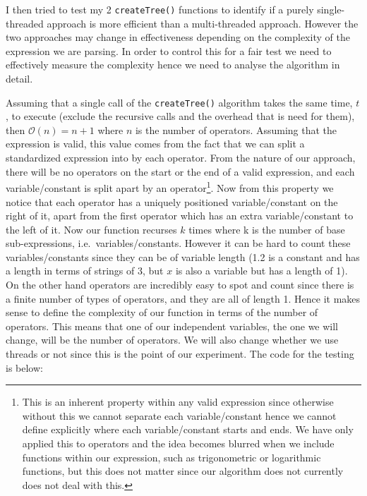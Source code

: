 \documentclass[../../../../../main.tex]{subfiles}
\begin{document}
\newpage\noindent
I then tried to test my 2 \texttt{createTree()} functions to identify if a purely single-threaded approach is more efficient than a multi-threaded approach. However the two approaches may change in effectiveness depending on the complexity of the expression we are parsing. In order to control this for a fair test we need to effectively measure the complexity hence we need to analyse the algorithm in detail.

Assuming that a single call of the \texttt{createTree()} algorithm takes the same time, $t$, to execute (exclude the recursive calls and the overhead that is need for them), then $\mathcal{O}(n) = n+1$ where $n$ is the number of operators. Assuming that the expression is valid, this value comes from the fact that we can split a standardized expression into by each operator. From the nature of our approach, there will be no operators on the start or the end of a valid expression, and each variable/constant is split apart by an operator\footnote{This is an inherent property within any valid expression since otherwise without this we cannot separate each variable/constant hence we cannot define explicitly where each variable/constant starts and ends. We have only applied this to operators and the idea becomes blurred when we include functions within our expression, such as trigonometric or logarithmic functions, but this does not matter since our algorithm does not currently does not deal with this.}. 
Now from this property we notice that each operator has a uniquely positioned variable/constant on the right of it, apart from the first operator which has an extra variable/constant to the left of it. Now our function recurses $k$ times where k is the number of base sub-expressions, i.e.\ variables/constants. However it can be hard to count these variables/constants since they can be of variable length (1.2 is a constant and has a length in terms of strings of 3, but $x$ is also a variable but has a length of 1). On the other hand operators are incredibly easy to spot and count since there is a finite number of types of operators, and they are all of length 1. Hence it makes sense to define the complexity of our function in terms of the number of operators. This means that one of our independent variables, the one we will change, will be the number of operators. We will also change whether we use threads or not since this is the point of our experiment. The code for the testing is below:
\end{document}
